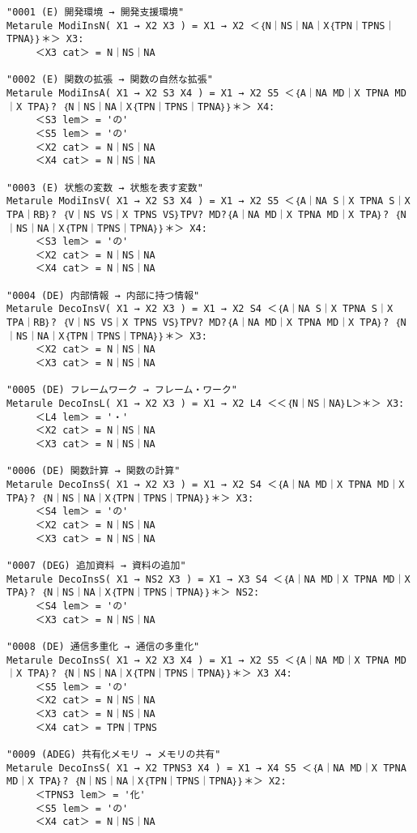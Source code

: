 \appendix

{\scriptsize
\begin{verbatim}
"0001 (E) 開発環境 → 開発支援環境"
Metarule ModiInsN( X1 → X2 X3 ) = X1 → X2 ＜｛N｜NS｜NA｜X｛TPN｜TPNS｜TPNA｝｝＊＞ X3:
     ＜X3 cat＞ = N｜NS｜NA

"0002 (E) 関数の拡張 → 関数の自然な拡張"
Metarule ModiInsA( X1 → X2 S3 X4 ) = X1 → X2 S5 ＜｛A｜NA MD｜X TPNA MD｜X TPA｝? ｛N｜NS｜NA｜X｛TPN｜TPNS｜TPNA｝｝＊＞ X4:
     ＜S3 lem＞ = 'の'
     ＜S5 lem＞ = 'の'
     ＜X2 cat＞ = N｜NS｜NA
     ＜X4 cat＞ = N｜NS｜NA

"0003 (E) 状態の変数 → 状態を表す変数"
Metarule ModiInsV( X1 → X2 S3 X4 ) = X1 → X2 S5 ＜｛A｜NA S｜X TPNA S｜X TPA｜RB｝? ｛V｜NS VS｜X TPNS VS｝TPV? MD?｛A｜NA MD｜X TPNA MD｜X TPA｝? ｛N｜NS｜NA｜X｛TPN｜TPNS｜TPNA｝｝＊＞ X4:
     ＜S3 lem＞ = 'の'
     ＜X2 cat＞ = N｜NS｜NA
     ＜X4 cat＞ = N｜NS｜NA

"0004 (DE) 内部情報 → 内部に持つ情報"
Metarule DecoInsV( X1 → X2 X3 ) = X1 → X2 S4 ＜｛A｜NA S｜X TPNA S｜X TPA｜RB｝? ｛V｜NS VS｜X TPNS VS｝TPV? MD?｛A｜NA MD｜X TPNA MD｜X TPA｝? ｛N｜NS｜NA｜X｛TPN｜TPNS｜TPNA｝｝＊＞ X3:
     ＜X2 cat＞ = N｜NS｜NA
     ＜X3 cat＞ = N｜NS｜NA

"0005 (DE) フレームワーク → フレーム・ワーク"
Metarule DecoInsL( X1 → X2 X3 ) = X1 → X2 L4 ＜＜｛N｜NS｜NA｝L＞＊＞ X3:
     ＜L4 lem＞ = '・'
     ＜X2 cat＞ = N｜NS｜NA
     ＜X3 cat＞ = N｜NS｜NA

"0006 (DE) 関数計算 → 関数の計算"
Metarule DecoInsS( X1 → X2 X3 ) = X1 → X2 S4 ＜｛A｜NA MD｜X TPNA MD｜X TPA｝? ｛N｜NS｜NA｜X｛TPN｜TPNS｜TPNA｝｝＊＞ X3:
     ＜S4 lem＞ = 'の'
     ＜X2 cat＞ = N｜NS｜NA
     ＜X3 cat＞ = N｜NS｜NA

"0007 (DEG) 追加資料 → 資料の追加"
Metarule DecoInsS( X1 → NS2 X3 ) = X1 → X3 S4 ＜｛A｜NA MD｜X TPNA MD｜X TPA｝? ｛N｜NS｜NA｜X｛TPN｜TPNS｜TPNA｝｝＊＞ NS2:
     ＜S4 lem＞ = 'の'
     ＜X3 cat＞ = N｜NS｜NA

"0008 (DE) 通信多重化 → 通信の多重化"
Metarule DecoInsS( X1 → X2 X3 X4 ) = X1 → X2 S5 ＜｛A｜NA MD｜X TPNA MD｜X TPA｝? ｛N｜NS｜NA｜X｛TPN｜TPNS｜TPNA｝｝＊＞ X3 X4:
     ＜S5 lem＞ = 'の'
     ＜X2 cat＞ = N｜NS｜NA
     ＜X3 cat＞ = N｜NS｜NA
     ＜X4 cat＞ = TPN｜TPNS

"0009 (ADEG) 共有化メモリ → メモリの共有"
Metarule DecoInsS( X1 → X2 TPNS3 X4 ) = X1 → X4 S5 ＜｛A｜NA MD｜X TPNA MD｜X TPA｝? ｛N｜NS｜NA｜X｛TPN｜TPNS｜TPNA｝｝＊＞ X2:
     ＜TPNS3 lem＞ = '化'
     ＜S5 lem＞ = 'の'
     ＜X4 cat＞ = N｜NS｜NA


\end{verbatim}}
